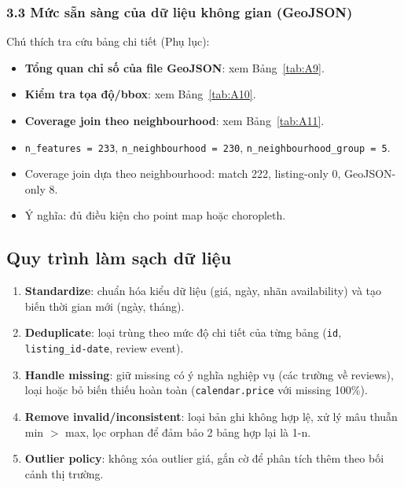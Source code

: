 \subsubsection*{3.3 Mức sẵn sàng của dữ liệu không gian (GeoJSON)}

Chú thích tra cứu bảng chi tiết (Phụ lục):

\begin{itemize}
    \item \textbf{Tổng quan chỉ số của file GeoJSON}: xem Bảng~\ref{tab:A9}.
    \item \textbf{Kiểm tra tọa độ/bbox}: xem Bảng~\ref{tab:A10}.
    \item \textbf{Coverage join theo neighbourhood}: xem Bảng~\ref{tab:A11}.
\end{itemize}

\begin{itemize}
    \item \texttt{n\_features = 233}, \texttt{n\_neighbourhood = 230}, \texttt{n\_neighbourhood\_group = 5}.
    \item Coverage join dựa theo neighbourhood: match 222, listing-only 0, GeoJSON-only 8.
    \item Ý nghĩa: đủ điều kiện cho point map hoặc choropleth.
\end{itemize}

\subsection{Quy trình làm sạch dữ liệu}

\begin{enumerate}
    \item \textbf{Standardize}: chuẩn hóa kiểu dữ liệu (giá, ngày, nhãn availability) và tạo biến thời gian mới (ngày, tháng).
    \item \textbf{Deduplicate}: loại trùng theo mức độ chi tiết của từng bảng (\texttt{id}, \texttt{listing\_id-date}, review event).
    \item \textbf{Handle missing}: giữ missing có ý nghĩa nghiệp vụ (các trường về reviews), loại hoặc bỏ biến thiếu hoàn toàn (\texttt{calendar.price} với missing 100\%).
    \item \textbf{Remove invalid/inconsistent}: loại bản ghi không hợp lệ, xử lý mâu thuẫn min $>$ max, lọc orphan để đảm bảo 2 bảng hợp lại là 1-n.
    \item \textbf{Outlier policy}: không xóa outlier giá, gắn cờ để phân tích thêm theo bối cảnh thị trường.
\end{enumerate}

